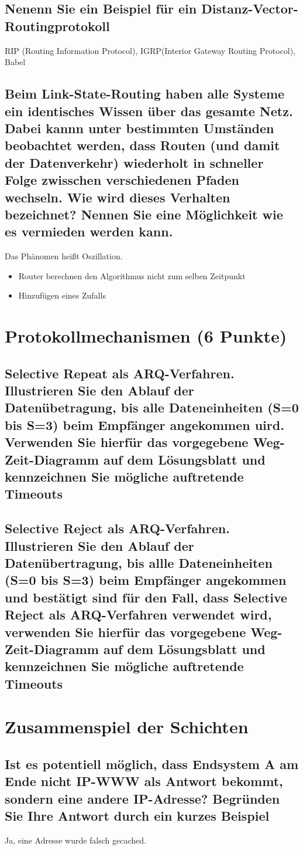 \documentclass[a4paper]{article}
\begin{document}
\subsection{Nenenn Sie ein Beispiel für ein Distanz-Vector-Routingprotokoll}
RIP (Routing Information Protocol), IGRP(Interior Gateway Routing Protocol), Babel
\subsection{Beim Link-State-Routing haben alle Systeme ein identisches Wissen über das gesamte Netz. Dabei kannn unter bestimmten Umständen beobachtet werden, dass Routen (und damit der Datenverkehr) wiederholt in schneller Folge zwisschen verschiedenen Pfaden wechseln. Wie wird dieses Verhalten bezeichnet? Nennen Sie eine Möglichkeit wie es vermieden werden kann.}
Das Phänomen heißt Oszillation.
\begin{itemize}
\item Router berechnen den Algorithmus nicht zum selben Zeitpunkt
\item Hinzufügen eines Zufalls
\end{itemize}
\pagebreak
\section{Protokollmechanismen (6 Punkte)}
\subsection{Selective Repeat als ARQ-Verfahren. Illustrieren Sie den Ablauf der Datenübetragung, bis alle Dateneinheiten (S=0 bis S=3) beim Empfänger angekommen uird. Verwenden Sie hierfür das vorgegebene Weg-Zeit-Diagramm auf dem Lösungsblatt und kennzeichnen Sie mögliche auftretende Timeouts}
\subsection{Selective Reject als ARQ-Verfahren. Illustrieren Sie den Ablauf der Datenübertragung, bis allle Dateneinheiten (S=0 bis S=3) beim Empfänger angekommen und bestätigt sind für den Fall, dass Selective Reject als ARQ-Verfahren verwendet wird, verwenden Sie hierfür das vorgegebene Weg-Zeit-Diagramm auf dem Lösungsblatt und kennzeichnen Sie mögliche auftretende Timeouts}
\pagebreak
\section{Zusammenspiel der Schichten}
\subsection{Ist es potentiell möglich, dass Endsystem A am Ende nicht IP-WWW als Antwort bekommt, sondern eine andere IP-Adresse? Begründen Sie Ihre Antwort durch ein kurzes Beispiel}
Ja, eine Adresse wurde falsch gecached.
\end{document}
